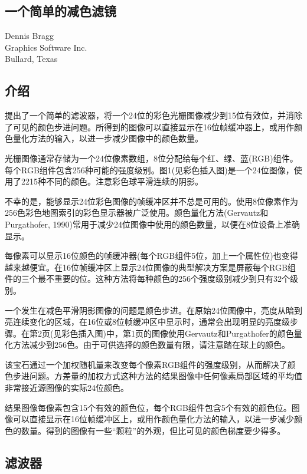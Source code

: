 \begin{CJK}{UTF8}{gbsn}
\newpage
\section{一个简单的减色滤镜}
\begin{center}
\small{
Dennis Bragg\\
Graphics Software Inc.\\
Bullard, Texas}
\end{center}
\subsection*{介绍}
提出了一个简单的滤波器，将一个24位的彩色光栅图像减少到15位有效位，并消除了可见的颜色步进问题。所得到的图像可以直接显示在16位帧缓冲器上，或用作颜色量化方法的输入，以进一步减少图像中的颜色数量。

光栅图像通常存储为一个24位像素数组，8位分配给每个红、绿、蓝(RGB)组件。每个RGB组件包含256种可能的强度级别。图1(见彩色插入图)是一个24位图像，使用了2215种不同的颜色。注意彩色球平滑连续的阴影。

不幸的是，能够显示24位彩色图像的帧缓冲区并不总是可用的。使用8位像素作为256色彩色地图索引的彩色显示器被广泛使用。颜色量化方法(Gervautz和Purgathofer, 1990)常用于减少24位图像中使用的颜色数量，以便在8位设备上准确显示。

每像素可以显示16位颜色的帧缓冲器(每个RGB组件5位，加上一个属性位)也变得越来越便宜。在16位帧缓冲区上显示24位图像的典型解决方案是屏蔽每个RGB组件的三个最不重要的位。这种方法将每种颜色的256个强度级别减少到只有32个级别。

一个发生在减色平滑阴影图像的问题是颜色步进。在原始24位图像中，亮度从暗到亮连续变化的区域，在16位或8位帧缓冲区中显示时，通常会出现明显的亮度级步骤。在第2页(见彩色插入图)中，第1页的图像使用Gervautz和Purgathofer的颜色量化方法减少到256色。由于可供选择的颜色数量有限，请注意踏在球上的颜色。

该宝石通过一个加权随机量来改变每个像素RGB组件的强度级别，从而解决了颜色步进问题。方差量的加权方式这种方法的结果图像中任何像素局部区域的平均值非常接近源图像的实际24位颜色。

结果图像每像素包含15个有效的颜色位，每个RGB组件包含5个有效的颜色位。图像可以直接显示在16位帧缓冲区上，或用作颜色量化方法的输入，以进一步减少颜色的数量。得到的图像有一些“颗粒”的外观，但比可见的颜色梯度要少得多。

\subsection*{滤波器}


\end{CJK}
